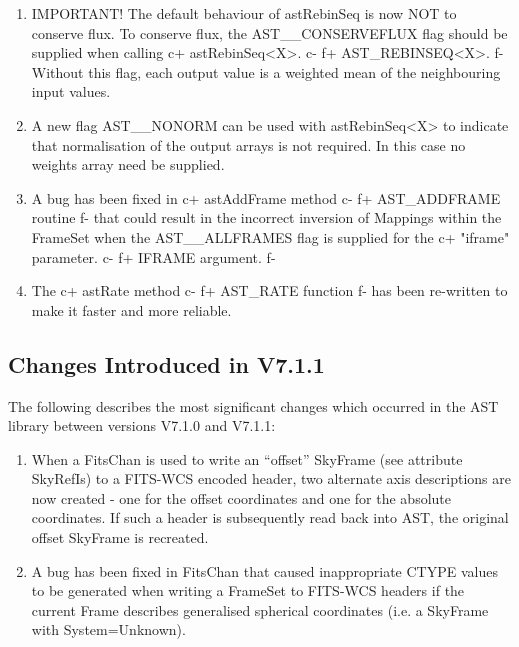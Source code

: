\documentclass[twoside,11pt]{starlink}
\begin{document}
\begin{enumerate}

\item IMPORTANT! The default behaviour of astRebinSeq is now NOT to conserve
flux. To conserve flux, the AST\_\_CONSERVEFLUX flag should be supplied
when calling
c+
astRebinSeq<X>.
c-
f+
AST\_REBINSEQ<X>.
f-
Without this flag, each output value is a weighted mean of the neighbouring
input values.

\item A new flag AST\_\_NONORM can be used with astRebinSeq<X> to indicate that
normalisation of the output arrays is not required. In this case no
weights array need be supplied.

\item A bug has been fixed in
c+
astAddFrame method
c-
f+
AST\_ADDFRAME routine
f-
that could result in the incorrect inversion of Mappings within the FrameSet
when the AST\_\_ALLFRAMES flag is supplied for the
c+
"iframe" parameter.
c-
f+
IFRAME argument.
f-

\item The
c+
astRate method
c-
f+
AST\_RATE function
f-
has been re-written to make it faster and more reliable.

\end{enumerate}

\subsection{Changes Introduced in V7.1.1}

The following describes the most significant changes which
occurred in the AST library between versions V7.1.0 and V7.1.1:

\begin{enumerate}

\item When a FitsChan is used to write an ``offset'' SkyFrame (see attribute
SkyRefIs) to a FITS-WCS encoded header, two alternate axis descriptions
are now created - one for the offset coordinates and one for the absolute
coordinates. If such a header is subsequently read back into AST, the
original offset SkyFrame is recreated.

\item A bug has been fixed in FitsChan that caused inappropriate CTYPE values
to be generated when writing a FrameSet to FITS-WCS headers if the
current Frame describes generalised spherical coordinates (i.e. a
SkyFrame with System=Unknown).

\end{enumerate}
\end{document}
